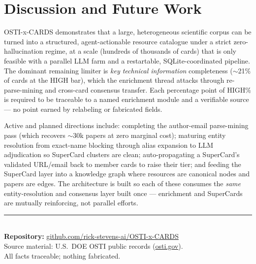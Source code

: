 \documentclass[11pt,letterpaper]{article}
\begin{document}
\section{Discussion and Future Work}

OSTI-x-CARDS demonstrates that a large, heterogeneous scientific corpus can be turned
into a structured, agent-actionable resource catalogue under a strict
zero-hallucination regime, at a scale (hundreds of thousands of cards) that is only
feasible with a parallel LLM farm and a restartable, SQLite-coordinated pipeline. The
dominant remaining limiter is \emph{key technical information} completeness
($\sim$21\% of cards at the HIGH bar), which the enrichment thread attacks through
re-parse-mining and cross-card consensus transfer. Each percentage point of HIGH\%
is required to be traceable to a named enrichment module and a verifiable source ---
no point earned by relabeling or fabricated fields.

Active and planned directions include: completing the author-email parse-mining pass
(which recovers $\sim$30k papers at zero marginal cost); maturing entity resolution
from exact-name blocking through alias expansion to LLM adjudication so SuperCard
clusters are clean; auto-propagating a SuperCard's validated URL/email back to member
cards to raise their tier; and feeding the SuperCard layer into a knowledge graph
where resources are canonical nodes and papers are edges. The architecture is built
so each of these consumes the \emph{same} entity-resolution and consensus layer built
once --- enrichment and SuperCards are mutually reinforcing, not parallel efforts.

\vspace{1em}
\begin{center}
\small\color{KuklaInk}
\rule{0.4\textwidth}{0.4pt}\\[4pt]
\textbf{Repository:} \href{https://github.com/rick-stevens-ai/OSTI-x-CARDS}{github.com/rick-stevens-ai/OSTI-x-CARDS}\\
Source material: U.S.\ DOE OSTI public records (\href{https://www.osti.gov}{osti.gov}).\\
All facts traceable; nothing fabricated.
\end{center}
\end{document}
